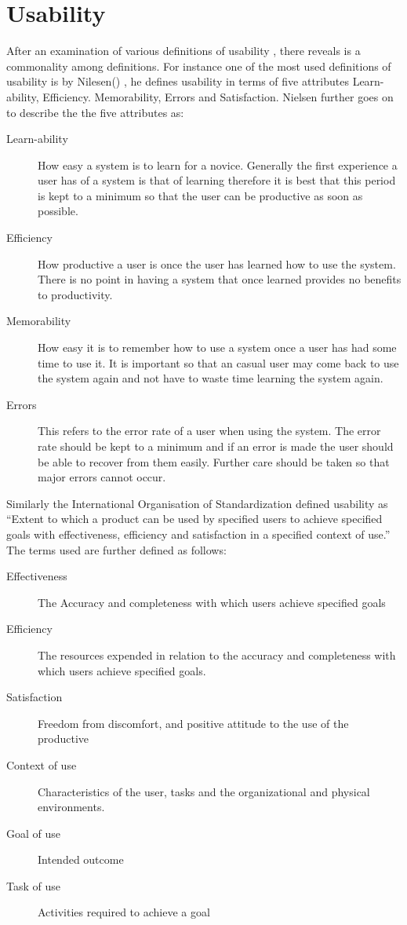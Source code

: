 \documentclass[a4paper,oneside,11pt]{report}
\begin{document}
\section{Usability}
After an examination of various definitions of usability , there reveals is a commonality among definitions. 
For instance one of the most used definitions of usability is by Nilesen(\citeyear{nielsens1993}) , he defines usability in terms of five attributes Learn-ability, Efficiency. Memorability, Errors and Satisfaction. Nielsen further goes on to describe the the five attributes as:
\begin{description}
  \item[Learn-ability] How easy a system is to learn for a novice. Generally the first experience a user has of a system is that of learning therefore it is best that this period is kept to a minimum so that the user can be productive as soon as possible.
  \item[Efficiency] How productive a user is once the user has learned how to use the system. There is no point in having a system that once learned provides no benefits to productivity.
  \item[Memorability] How easy it is to remember how to use a system once a user has had some time to use it.  It is important so that an casual user may come back to use the system again and not have to waste time learning the system again.
  \item[Errors] This refers to the error rate of a user when using the system. The error rate should be kept to a minimum and if an error is made the user should be able to recover from them easily. Further care should be taken so that major errors cannot occur.
\end{description}

Similarly the International Organisation of Standardization \autocite{ISO9241-11} defined usability as \enquote {Extent to which a product can be used by specified users to achieve specified goals with effectiveness, efficiency and satisfaction in a specified context of use.} 
The terms used are further defined as follows:

\begin{description}
  \item[Effectiveness] The Accuracy and completeness with which users achieve specified goals
  \item[Efficiency] The resources expended in relation to the accuracy and completeness with which users achieve specified goals.
  \item [Satisfaction] Freedom from discomfort, and positive attitude to the use of the productive
 \item [Context of use] Characteristics of the user, tasks and the organizational and physical environments.
  \item [Goal of use] Intended outcome
  \item [Task of use] Activities required to achieve a goal
\end{description}
\end{document}
